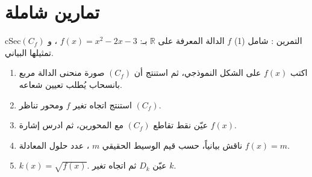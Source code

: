 \documentclass[12pt,a4paper]{article}
\newenvironment{BOX}[2]{\begin{otherlanguage}{english}\begin{arbox}{#1}{#2}}{\end{arbox}\end{otherlanguage}}
\newcounter{exo}
\newenvironment{tamrin}[1]{\stepcounter{exo}\begin{BOX}{cSec}{التمرين \theexo: #1}}{\end{BOX}}
\newcommand{\R}{\mathbb{R}}
\begin{document}
\section{تمارين شاملة}
\begin{tamrin}{شامل (1)}
$f$ الدالة المعرفة على $\R$ بـ: $f(x)=x^2-2x-3$ ، و $(C_f)$ تمثيلها البياني.
\begin{enumerate}
\item اكتب $f(x)$ على الشكل النموذجي، ثم استنتج أن $(C_f)$ صورة منحنى الدالة مربع بانسحاب يُطلب تعيين شعاعه.
\item استنتج اتجاه تغير $f$ ومحور تناظر $(C_f)$.
\item عيّن نقط تقاطع $(C_f)$ مع المحورين، ثم ادرس إشارة $f(x)$.
\item ناقش بيانياً، حسب قيم الوسيط الحقيقي $m$ ، عدد حلول المعادلة $f(x)=m$.
\item $k(x)=\sqrt{f(x)}$. عيّن $D_k$ ثم اتجاه تغير $k$.
\end{enumerate}
\end{tamrin}
\end{document}
